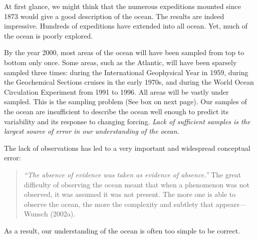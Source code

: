 At first glance, we might think that the numerous expeditions mounted since
1873 would give a good description of the ocean. The results are indeed
impressive. Hundreds of expeditions have extended into all ocean. Yet, much
of the ocean is poorly explored.

By the year 2000, most areas of the ocean will have been sampled from
top to bottom only once. Some areas, such as the Atlantic, will have been sparsely sampled three times: during the International Geophysical Year in 1959, during the Geochemical Sections cruises in the early 1970s, and during the World Ocean Circulation Experiment from 1991 to 1996. All areas will be vastly under sampled. This is the sampling problem (See box on next
page). Our samples of the ocean are insufficient to describe the ocean well enough to predict
its variability and its response to changing forcing. \textit{Lack of sufficient samples is the
largest source of error in our understanding of the ocean.}

The lack of observations has led to a very important and widespread conceptual error:
\begin{quote} \small
\textit{``The absence of evidence was taken as evidence of absence.''} The great difficulty of
observing the ocean meant that when a phenomenon was not observed, it was assumed it was not
present. The more one is able to observe the ocean, the more the complexity and subtlety that
appears---Wunsch (2002a).
\end{quote}
As a result, our understanding of the ocean is often too simple to be correct.

